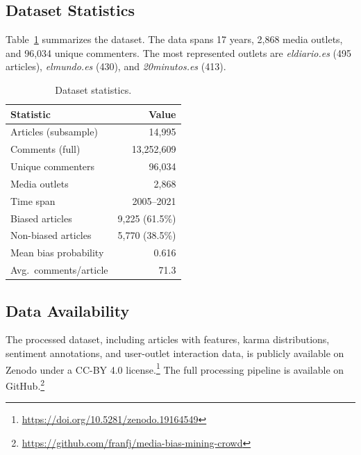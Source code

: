\subsection{Dataset Statistics}

Table~\ref{tab:dataset_stats} summarizes the dataset.
The data spans 17 years, 2,868 media outlets, and 96,034 unique commenters.
The most represented outlets are \textit{eldiario.es} (495 articles), \textit{elmundo.es} (430), and \textit{20minutos.es} (413).

\begin{table}[t]
\centering
\small
\begin{tabular}{lr}
\toprule
\textbf{Statistic} & \textbf{Value} \\
\midrule
Articles (subsample) & 14,995 \\
Comments (full) & 13,252,609 \\
Unique commenters & 96,034 \\
Media outlets & 2,868 \\
Time span & 2005--2021 \\
Biased articles & 9,225 (61.5\%) \\
Non-biased articles & 5,770 (38.5\%) \\
Mean bias probability & 0.616 \\
Avg.\ comments/article & 71.3 \\
\bottomrule
\end{tabular}
\caption{Dataset statistics.}
\label{tab:dataset_stats}
\end{table}

\subsection{Data Availability}

The processed dataset, including articles with features, karma distributions, sentiment annotations, and user-outlet interaction data, is publicly available on Zenodo under a CC-BY 4.0 license.\footnote{\url{https://doi.org/10.5281/zenodo.19164549}}
The full processing pipeline is available on GitHub.\footnote{\url{https://github.com/franfj/media-bias-mining-crowd}}
